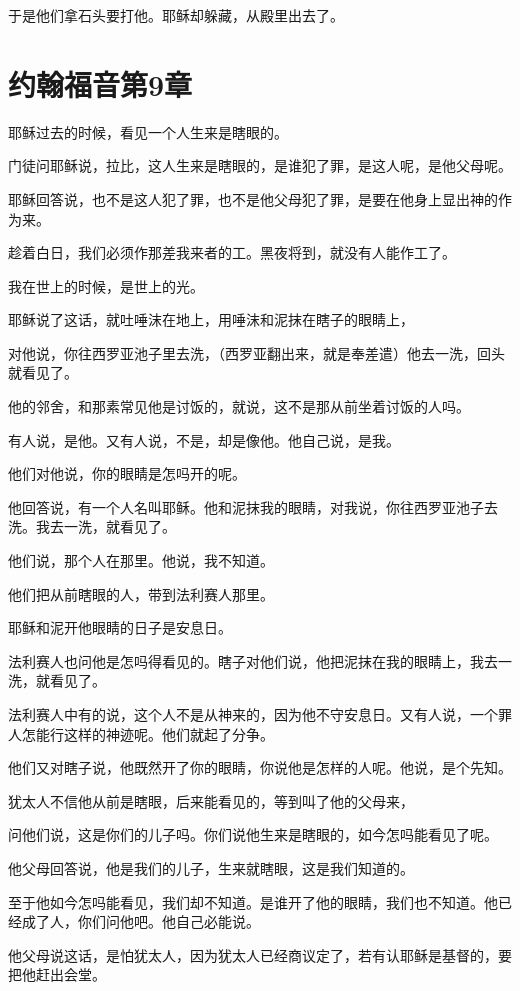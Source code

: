 \documentclass[12pt,oneside]{book}
\begin{document}
于是他们拿石头要打他。耶稣却躲藏，从殿里出去了。

\chapter{约翰福音第9章}
耶稣过去的时候，看见一个人生来是瞎眼的。

门徒问耶稣说，拉比，这人生来是瞎眼的，是谁犯了罪，是这人呢，是他父母呢。

耶稣回答说，也不是这人犯了罪，也不是他父母犯了罪，是要在他身上显出神的作为来。

趁着白日，我们必须作那差我来者的工。黑夜将到，就没有人能作工了。

我在世上的时候，是世上的光。

耶稣说了这话，就吐唾沫在地上，用唾沫和泥抹在瞎子的眼睛上，

对他说，你往西罗亚池子里去洗，（西罗亚翻出来，就是奉差遣）他去一洗，回头就看见了。

他的邻舍，和那素常见他是讨饭的，就说，这不是那从前坐着讨饭的人吗。

有人说，是他。又有人说，不是，却是像他。他自己说，是我。

他们对他说，你的眼睛是怎吗开的呢。

他回答说，有一个人名叫耶稣。他和泥抹我的眼睛，对我说，你往西罗亚池子去洗。我去一洗，就看见了。

他们说，那个人在那里。他说，我不知道。

他们把从前瞎眼的人，带到法利赛人那里。

耶稣和泥开他眼睛的日子是安息日。

法利赛人也问他是怎吗得看见的。瞎子对他们说，他把泥抹在我的眼睛上，我去一洗，就看见了。

法利赛人中有的说，这个人不是从神来的，因为他不守安息日。又有人说，一个罪人怎能行这样的神迹呢。他们就起了分争。

他们又对瞎子说，他既然开了你的眼睛，你说他是怎样的人呢。他说，是个先知。

犹太人不信他从前是瞎眼，后来能看见的，等到叫了他的父母来，

问他们说，这是你们的儿子吗。你们说他生来是瞎眼的，如今怎吗能看见了呢。

他父母回答说，他是我们的儿子，生来就瞎眼，这是我们知道的。

至于他如今怎吗能看见，我们却不知道。是谁开了他的眼睛，我们也不知道。他已经成了人，你们问他吧。他自己必能说。

他父母说这话，是怕犹太人，因为犹太人已经商议定了，若有认耶稣是基督的，要把他赶出会堂。
\end{document}
